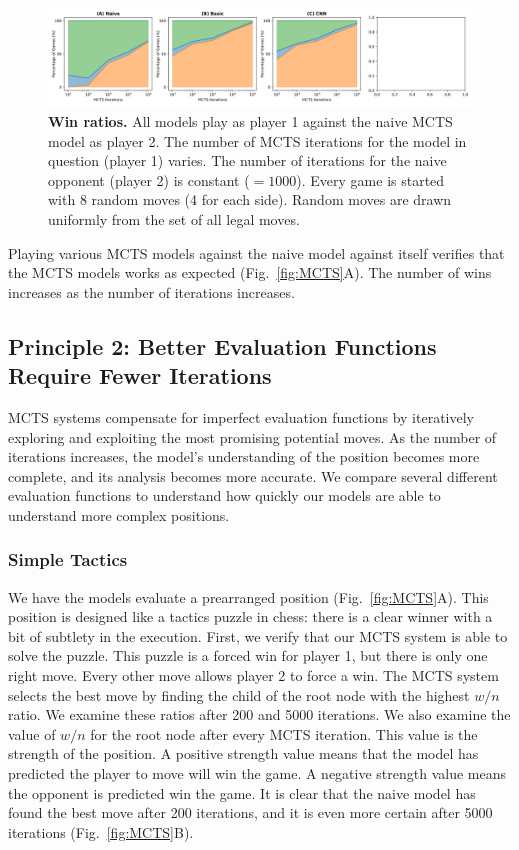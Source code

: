 \documentclass[10pt]{article}
\begin{document}
\begin{figure}[H]
    \centering
    \includegraphics[width=\linewidth]{win_rates.png}
    \caption{\textbf{Win ratios.} All models play as player 1 against the naive MCTS model as player 2. The number of MCTS iterations for the model in question (player 1) varies. The number of iterations for the naive opponent (player 2) is constant ($= 1000$). Every game is started with 8 random moves (4 for each side). Random moves are drawn uniformly from the set of all legal moves.}
    \label{fig:selfplay}
\end{figure}

Playing various MCTS models against the naive model  against itself verifies that the MCTS models works as expected (Fig.~\ref{fig:MCTS}A). The number of wins increases as the number of iterations increases.



\subsection{Principle 2: Better Evaluation Functions Require Fewer Iterations}

MCTS systems compensate for imperfect evaluation functions by iteratively exploring and exploiting the most promising potential moves. As the number of iterations increases, the model's understanding of the position becomes more complete, and its analysis becomes more accurate. We compare several different evaluation functions to understand how quickly our models are able to understand more complex positions.


\subsubsection{Simple Tactics}
We have the models evaluate a prearranged position (Fig.~\ref{fig:MCTS}A). This position is designed like a tactics puzzle in chess: there is a clear winner with a bit of subtlety in the execution. First, we verify that our MCTS system is able to solve the puzzle. This puzzle is a forced win for player 1, but there is only one right move. Every other move allows player 2 to force a win. The MCTS system selects the best move by finding the child of the root node with the highest $w / n$ ratio. We examine these ratios after 200 and 5000 iterations. We also examine the value of $w / n$ for the root node after every MCTS iteration. This value is the strength of the position. A positive strength value means that the model has predicted the player to move will win the game. A negative strength value means the opponent is predicted win the game. It is clear that the naive model has found the best move after 200 iterations, and it is even more certain after 5000 iterations (Fig.~\ref{fig:MCTS}B).
\end{document}

